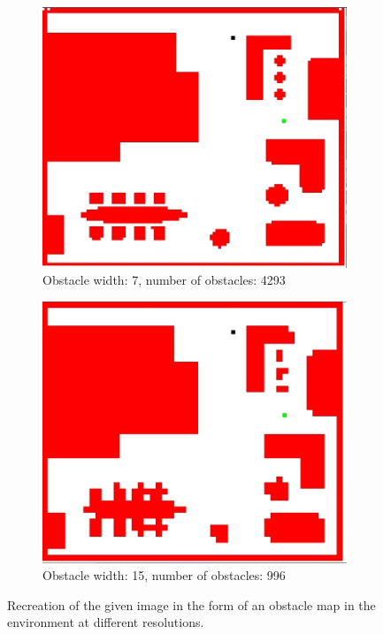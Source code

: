 \begin{enumerate}
\vfill
\begin{figure}[!h]\ContinuedFloat
	\begin{subfigure}[b]{.5\textwidth}
		\centering
		\includegraphics[width=.95\linewidth]{figures/obs_width_7_total_obs_4293.jpg}
		\caption{Obstacle width: 7, number of obstacles: 4293}
		\label{fig:obsmap_sfig3}
	\end{subfigure}
	\begin{subfigure}[b]{.5\textwidth}
		\centering
		\includegraphics[width=.95\linewidth]{figures/obs_width_15_total_obs_996.jpg}
		\caption{Obstacle width: 15, number of obstacles: 996}
		\label{fig:obsmap_sfig4}
\end{subfigure}
	\caption{Recreation of the given image in the form of an obstacle map in the environment at different resolutions.}
	\label{fig:fig}
\end{figure}



\end{enumerate}

